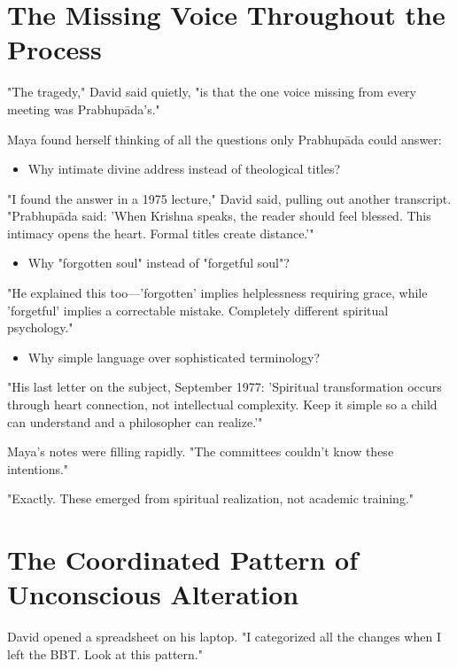 \documentclass[11pt,twoside]{book}
\begin{document}
\section*{The Missing Voice Throughout the Process}
\label{sec:org2fb1436}

"The tragedy," David said quietly, "is that the one voice missing from every meeting was Prabhupāda's."

Maya found herself thinking of all the questions only Prabhupāda could answer:

\begin{itemize}
\item Why intimate divine address instead of theological titles?
\end{itemize}

"I found the answer in a 1975 lecture," David said, pulling out another transcript. "Prabhupāda said: 'When Krishna speaks, the reader should feel blessed. This intimacy opens the heart. Formal titles create distance.'"

\begin{itemize}
\item Why "forgotten soul" instead of "forgetful soul"?
\end{itemize}

"He explained this too—'forgotten' implies helplessness requiring grace, while 'forgetful' implies a correctable mistake. Completely different spiritual psychology."

\begin{itemize}
\item Why simple language over sophisticated terminology?
\end{itemize}

"His last letter on the subject, September 1977: 'Spiritual transformation occurs through heart connection, not intellectual complexity. Keep it simple so a child can understand and a philosopher can realize.'"

Maya's notes were filling rapidly. "The committees couldn't know these intentions."

"Exactly. These emerged from spiritual realization, not academic training."
\section*{The Coordinated Pattern of Unconscious Alteration}
\label{sec:orgbde61e0}

David opened a spreadsheet on his laptop. "I categorized all the changes when I left the BBT. Look at this pattern."
\end{document}
